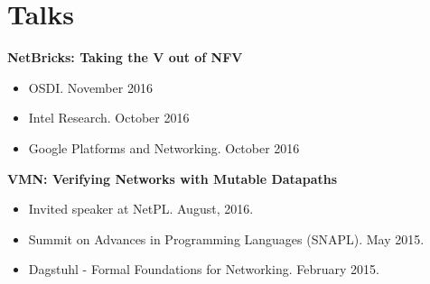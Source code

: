 \documentclass[11pt,letterpaper,sans]{moderncv}        %
\begin{document}






\section{Talks}
    \textbf{NetBricks: Taking the V out of NFV}
    \begin{itemize}
        \item OSDI. November 2016
        \item Intel Research. October 2016
        \item Google Platforms and Networking. October 2016
    \end{itemize}
    
    \textbf{VMN: Verifying Networks with Mutable Datapaths}
    \begin{itemize}
        \item Invited speaker at NetPL. August, 2016.
        \item Summit on Advances in Programming Languages (SNAPL). May 2015.
        \item Dagstuhl - Formal Foundations for Networking. February 2015.
    \end{itemize}
\end{document}
